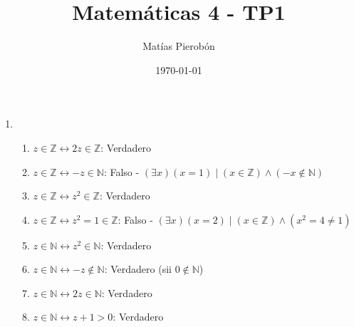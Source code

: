 \documentclass[11pt]{article}
\title{Matemáticas 4 - TP1}
\author{Matías Pierobón}
\date{\today}
\begin{document}
\maketitle

\begin{enumerate}
\item 
\begin{enumerate}
	\item $z \in \mathbb{Z} \leftrightarrow 2 z \in \mathbb{Z}$: Verdadero
	\item $z \in \mathbb{Z} \leftrightarrow -z \in \mathbb{N}$: Falso - $\left(\exists x\right) \left(x = 1\right) \mid \left(x \in \mathbb{Z}\right) \land \left(-x \notin \mathbb{N}\right)$
	\item $z \in \mathbb{Z} \leftrightarrow z^2 \in \mathbb{Z}$: Verdadero
	\item $z \in \mathbb{Z} \leftrightarrow z^2 = 1 \in \mathbb{Z}$: Falso - $\left(\exists x\right) \left(x = 2\right) \mid \left(x \in \mathbb{Z}\right) \land \left(x^2 = 4 \neq 1\right)$
	\item $z \in \mathbb{N} \leftrightarrow z^2 \in \mathbb{N}$: Verdadero
	\item $z \in \mathbb{N} \leftrightarrow -z \notin \mathbb{N}$: Verdadero (sii $0 \notin \mathbb{N}$)
	\item $z \in \mathbb{N} \leftrightarrow 2z \in \mathbb{N}$: Verdadero
	\item $z \in \mathbb{N} \leftrightarrow z + 1 > 0$: Verdadero
\end{enumerate}


\end{enumerate}
\end{document}
